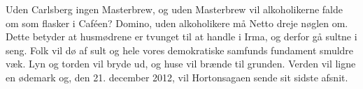 \documentclass[a4paper,11pt]{article}
\begin{document}
\begin{sketch}
Uden Carlsberg ingen Masterbrew, og uden Masterbrew vil alkoholikerne falde om som flasker i Caféen? Domino, uden alkoholikere må Netto dreje nøglen om. Dette betyder at husmødrene er tvunget til at handle i Irma, og derfor gå sultne i seng. Folk vil dø af sult og hele vores demokratiske samfunds fundament smuldre væk. Lyn og torden vil bryde ud, og huse vil brænde til grunden. Verden vil ligne en ødemark og, den 21. december 2012, vil Hortonsagaen sende sit sidste afsnit.
\end{sketch}
\end{document}
